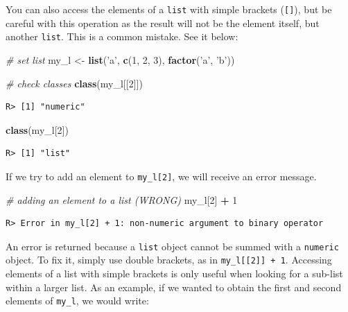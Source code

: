 \documentclass[
  12pt,
]{book}
\newenvironment{Shaded}{\begin{snugshade}}{\end{snugshade}}
\newcommand{\CommentTok}[1]{\textcolor[rgb]{0.37,0.37,0.37}{\textit{#1}}}
\newcommand{\DecValTok}[1]{\textcolor[rgb]{0.06,0.06,0.06}{#1}}
\newcommand{\KeywordTok}[1]{\textcolor[rgb]{0.27,0.27,0.27}{\textbf{#1}}}
\newcommand{\NormalTok}[1]{#1}
\newcommand{\OperatorTok}[1]{\textcolor[rgb]{0.43,0.43,0.43}{\textbf{#1}}}
\newcommand{\StringTok}[1]{\textcolor[rgb]{0.5,0.5,0.5}{#1}}
\begin{document}
You can also access the elements of a \texttt{list} with simple brackets (\texttt{{[}{]}}), but be careful with this operation as the result will not be the element itself, but another \texttt{list}. This is a common mistake. See it below:

\begin{Shaded}
\begin{Highlighting}[]
\CommentTok{# set list}
\NormalTok{my_l <-}\StringTok{ }\KeywordTok{list}\NormalTok{(}\StringTok{'a'}\NormalTok{,}
             \KeywordTok{c}\NormalTok{(}\DecValTok{1}\NormalTok{, }\DecValTok{2}\NormalTok{, }\DecValTok{3}\NormalTok{),}
             \KeywordTok{factor}\NormalTok{(}\StringTok{'a'}\NormalTok{, }\StringTok{'b'}\NormalTok{))}

\CommentTok{# check classes}
\KeywordTok{class}\NormalTok{(my_l[[}\DecValTok{2}\NormalTok{]])}
\end{Highlighting}
\end{Shaded}

\begin{verbatim}
R> [1] "numeric"
\end{verbatim}

\begin{Shaded}
\begin{Highlighting}[]
\KeywordTok{class}\NormalTok{(my_l[}\DecValTok{2}\NormalTok{])}
\end{Highlighting}
\end{Shaded}

\begin{verbatim}
R> [1] "list"
\end{verbatim}

If we try to add an element to \texttt{my\_l{[}2{]}}, we will receive an error message.

\begin{Shaded}
\begin{Highlighting}[]
\CommentTok{# adding an element to a list (WRONG)}
\NormalTok{my_l[}\DecValTok{2}\NormalTok{] }\OperatorTok{+}\StringTok{ }\DecValTok{1}
\end{Highlighting}
\end{Shaded}

\begin{verbatim}
R> Error in my_l[2] + 1: non-numeric argument to binary operator
\end{verbatim}

An error is returned because a \texttt{list} object cannot be summed with a \texttt{numeric} object. To fix it, simply use double brackets, as in \texttt{my\_l{[}{[}2{]}{]}\ +\ 1}. Accessing elements of a list with simple brackets is only useful when looking for a sub-list within a larger list. As an example, if we wanted to obtain the first and second elements of \texttt{my\_l}, we would write:
\end{document}
